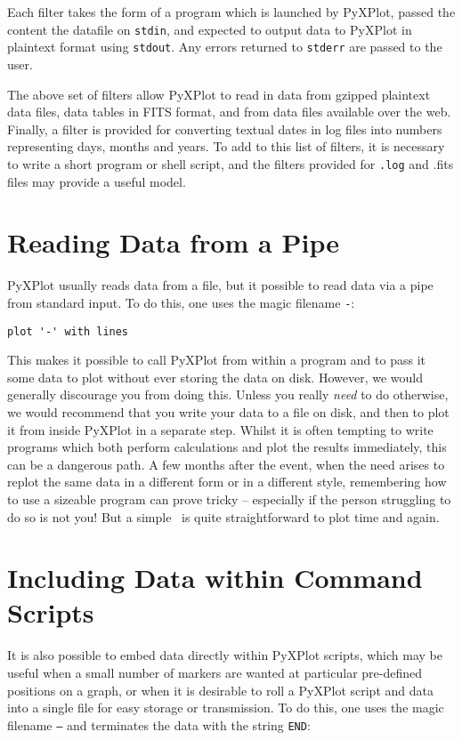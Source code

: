 Each filter takes the form of a program which is launched by PyXPlot, passed
the content the datafile on {\tt stdin}, and expected to output data to PyXPlot
in plaintext format using {\tt stdout}. Any errors returned to {\tt stderr} are
passed to the user.

The above set of filters allow PyXPlot to read in data from gzipped plaintext
data files, data tables in FITS format, and from data files available over the
web. Finally, a filter is provided for converting textual dates in log files
into numbers representing days, months and years. To add to this list of
filters, it is necessary to write a short program or shell script, and the
filters provided for {\tt .log} and {.fits} files may provide a useful model.

\section{Reading Data from a Pipe}

PyXPlot usually reads data from a file, but it possible to read data via a pipe
from standard input.  To do this, one uses the magic filename {\tt -}:

\begin{verbatim}
plot '-' with lines
\end{verbatim}

This makes it possible to call PyXPlot from within a program and to pass it
some data to plot without ever storing the data on disk.  However, we would
generally discourage you from doing this. Unless you really {\it need} to do
otherwise, we would recommend that you write your data to a file on disk, and
then to plot it from inside PyXPlot in a separate step.  Whilst it is often
tempting to write programs which both perform calculations and plot the results
immediately, this can be a dangerous path. A few months after the event, when
the need arises to replot the same data in a different form or in a different
style, remembering how to use a sizeable program can prove tricky -- especially
if the person struggling to do so is not you! But a simple \datafile\ is quite
straightforward to plot time and again.

\section{Including Data within Command Scripts}

It is also possible to embed data directly within PyXPlot scripts, which may be
useful when a small number of markers are wanted at particular pre-defined
positions on a graph, or when it is desirable to roll a PyXPlot script and data
into a single file for easy storage or transmission. To do this, one uses the
magic filename {\tt --} and terminates the data with the string {\tt END}:

